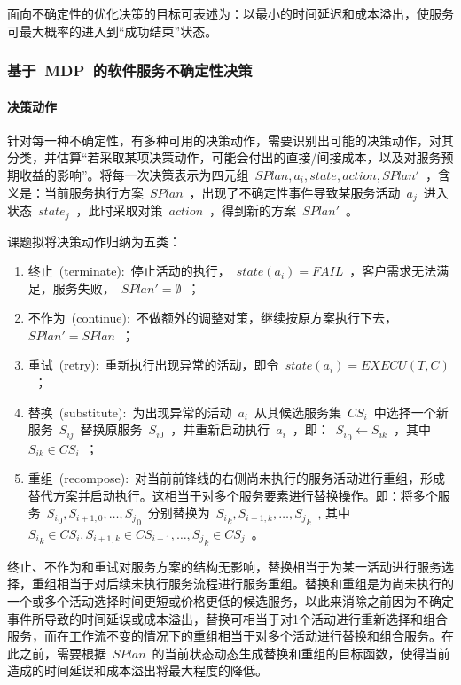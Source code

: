 面向不确定性的优化决策的目标可表述为：以最小的时间延迟和成本溢出，使服务可最大概率的进入到“成功结束”状态。

\subsubsection{基于~MDP~的软件服务不确定性决策}
\setcounter{paragraph}{0}
\paragraph{决策动作} \label{sec:action}

针对每一种不确定性，有多种可用的决策动作，需要识别出可能的决策动作，对其分类，并估算“若采取某项决策动作，可能会付出的直接/间接成本，以及对服务预期收益的影响”。将每一次决策表示为四元组~$SPlan,{a_i},state,action,SPlan'$~，含义是：当前服务执行方案~$SPlan$~，出现了不确定性事件导致某服务活动~$a_j$~进入状态~$state_j$~，此时采取对策~$action$~，得到新的方案~$SPlan'$~。

课题拟将决策动作归纳为五类：
\begin{enumerate}
    \item 终止~(terminate):~停止活动的执行，~$state(a_i)=FAIL$~，客户需求无法满足，服务失败，~$SPlan'=\emptyset $~；
    \item 不作为~(continue):~不做额外的调整对策，继续按原方案执行下去，~$SPlan'=SPlan$~；
    \item 重试~(retry):~重新执行出现异常的活动，即令~$state(a_i)=EXECU(T, C)$~；
    \item 替换~(substitute):~为出现异常的活动~$a_i$~从其候选服务集~$CS_i$~中选择一个新服务~$S_{ij}$~替换原服务~$S_{i0}$~，并重新启动执行~$a_i$~，即：~${S_i}_0 \leftarrow {S_{ik}}$~，其中~${S_{ik}} \in C{S_i}$~；
    \item 重组~(recompose):~对当前前锋线的右侧尚未执行的服务活动进行重组，形成替代方案并启动执行。这相当于对多个服务要素进行替换操作。即：将多个服务~${S_i}_0,{S_{i + 1,0}}, \ldots ,{S_j}_0$~分别替换为~${S_i}_k,{S_{i + 1,k}}, \ldots ,{S_j}_k$~, 其中~${S_i}_k \in C{S_i},{S_{i + 1,k}} \in C{S_{i + 1}}, \ldots ,{S_j}_k \in C{S_j}$~。
\end{enumerate}

终止、不作为和重试对服务方案的结构无影响，替换相当于为某一活动进行服务选择，重组相当于对后续未执行服务流程进行服务重组。替换和重组是为尚未执行的一个或多个活动选择时间更短或价格更低的候选服务，以此来消除之前因为不确定事件所导致的时间延误或成本溢出，替换可相当于对1个活动进行重新选择和组合服务，而在工作流不变的情况下的重组相当于对多个活动进行替换和组合服务。在此之前，需要根据~$SPlan$~的当前状态动态生成替换和重组的目标函数，使得当前造成的时间延误和成本溢出将最大程度的降低。

